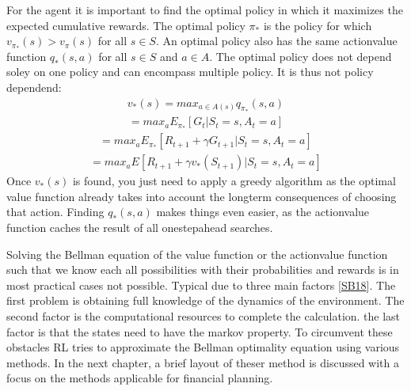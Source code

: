 \documentclass[letterpaper,10pt,english]{jupyterBook}
\begin{document}
\sphinxAtStartPar
For the agent it is important to find the optimal policy in which it maximizes the expected cumulative rewards. The optimal policy \(\pi_*\) is the policy for which \(v_{\pi_*}(s) > v_{\pi}(s)\) for all \(s \in S\). An optimal policy also has the same action\sphinxhyphen{}value function \(q_*(s,a)\) for all \(s \in S\) and \(a \in A\). The optimal policy does not depend soley on one policy and can encompass multiple policy. It is thus not policy dependend:
\begin{equation*}
\begin{split} v_*(s) = max_{a \in A(s)} q_{\pi_*}(s,a) \end{split}
\end{equation*}\begin{equation*}
\begin{split} = max_{a} E_{\pi_*}[G_t | S_t=s, A_t=a] \end{split}
\end{equation*}\begin{equation*}
\begin{split} = max_{a} E_{\pi_*}[R_{t+1} + \gamma G_{t+1} | S_t=s, A_t=a] \end{split}
\end{equation*}\begin{equation*}
\begin{split} = max_{a} E[R_{t+1} + \gamma v_*(S_{t+1}) | S_t=s, A_t=a] \end{split}
\end{equation*}
\sphinxAtStartPar
Once \(v_*(s)\) is found, you just need to apply a greedy algorithm as the optimal value function already takes into account the long\sphinxhyphen{}term consequences of choosing that action. Finding \(q_*(s,a)\) makes things even easier, as the action\sphinxhyphen{}value function caches the result of all one\sphinxhyphen{}step\sphinxhyphen{}ahead searches.

\sphinxAtStartPar
Solving the Bellman equation of the value function or the action\sphinxhyphen{}value function such that we know each all possibilities with their probabilities and rewards is in most practical cases not possible. Typical due to three main factors {[}\hyperlink{cite.Financial_application:id70}{SB18}{]}. The first problem is obtaining full knowledge of the dynamics of the environment. The second factor is the computational resources to complete the calculation. the last factor is that the states need to have the markov property.   To circumvent these obstacles RL tries to approximate the Bellman optimality equation using various methods. In the next chapter, a brief layout of theser method is discussed with a focus on the methods applicable for financial planning.
\end{document}
